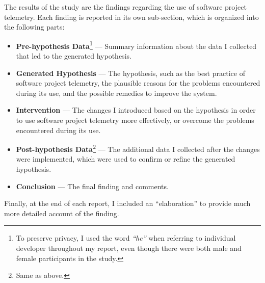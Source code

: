 The results of the study are the findings regarding the use of software project telemetry. Each finding is reported in its own sub-section, which is organized into the following parts:

\begin{itemize}
	\item \textbf{Pre-hypothesis Data}\footnote{To preserve privacy, I used the word \textit{``he''} when referring to individual developer throughout my report, even though there were both male and female participants in the study.} --- Summary information about the data I collected that led to the generated hypothesis.

	\item \textbf{Generated Hypothesis} --- The hypothesis, such as the best practice of software project telemetry, the plausible reasons for the problems encountered during its use, and the possible remedies to improve the system.
	
	\item \textbf{Intervention} --- The changes I introduced based on the hypothesis in order to use software project telemetry more effectively, or overcome the problems encountered during its use.
	
	\item \textbf{Post-hypothesis Data}\footnote{Same as above.} --- The additional data I collected after the changes were implemented, which were used to confirm or refine the generated hypothesis. 
	
	\item \textbf{Conclusion} --- The final finding and comments.
	
\end{itemize}
	
Finally, at the end of each report, I included an ``elaboration'' to provide much more detailed account of the finding.







\clearpage
